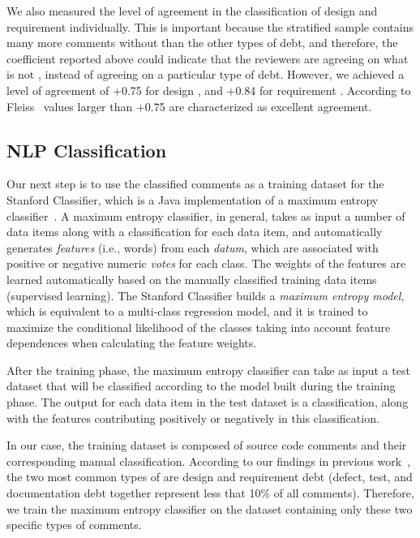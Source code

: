  We also measured the level of agreement in the classification of design and requirement \SATD individually. This is important because the stratified sample contains many more comments without \SATD than the other types of debt, and therefore, the coefficient reported above could indicate that the reviewers are agreeing on what is not \SATD, instead of agreeing on a particular type of debt. However, we achieved a level of agreement of +0.75 for design \SATD, and +0.84 for requirement \SATD. According to Fleiss~\cite{Fleiss1981measurement} values larger than +0.75 are characterized as excellent agreement.

\subsection{NLP Classification}
\label{chap4:nlp_classification}

Our next step is to use the classified \SATD comments as a training dataset for the Stanford Classifier, which is a Java implementation of a maximum entropy classifier~\cite{manning2003optimization}. A maximum entropy classifier, in general, takes as input a number of data items along with a classification for each data item, and automatically generates \textit{features} (i.e., words) from each \textit{datum}, which are associated with positive or negative numeric \textit{votes} for each class. The weights of the features are learned automatically based on the manually classified training data items (supervised learning). The Stanford Classifier builds a \textit{maximum entropy model}, which is equivalent to a multi-class regression model, and it is trained to maximize the conditional likelihood of the classes taking into account feature dependences when calculating the feature weights.

After the training phase, the maximum entropy classifier can take as input a test dataset that will be classified according to the model built during the training phase. The output for each data item in the test dataset is a classification, along with the features contributing positively or negatively in this classification.

In our case, the training dataset is composed of source code comments and their corresponding manual classification.
According to our findings in previous work~\cite{Maldonado2015MTD}, the two most common types of \SATD are design and requirement debt (defect, test, and documentation debt together represent less that 10\% of all \SATD comments).
Therefore, we train the maximum entropy classifier on the dataset containing only these two specific types of \SATD comments.

